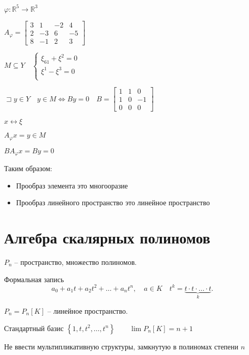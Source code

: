 \documentclass{book}
\newcommand\R{\ensuremath{\mathbb{R}}}
\theoremstyle{definition}
\begin{document}
\begin{problem}
    $\varphi:\R^5 \to \R^3$

    $A_{\varphi} = \begin{bmatrix} 3&1&-2&4\\2&-3&6&-5\\8&-1&2&3 \end{bmatrix} $ 

    $M\subseteq Y\quad \begin{cases}
        \xi_{61} + \xi^2 = 0\\
        \xi^1 - \xi^3 = 0\\
    \end{cases}$ 

    $\sqsupset y\in Y\quad y\in M \iff By = 0\quad B = \begin{bmatrix} 1&1&0\\1&0&-1\\0&0&0 \end{bmatrix} $

     $x\longleftrightarrow \xi$

     $A_{\varphi}x = y\in M$

     $BA_{\varphi}x = By = 0$

    Таким образом:
    \begin{itemize}
        \item Прообраз элемента это многооразие
        \item Прообраз линейного пространство это линейное пространство
    \end{itemize}
\end{problem}

\section{Алгебра скалярных полиномов}

$P_n$ -- пространство, множество полиномов. 

 \begin{definition}
     [Полином]
     Формальная запись \[
         a_0 + a_1t + a_2t^2 + \ldots + a_nt^n,\quad a\in K\quad t^k = \underbrace{t\cdot t\cdot \ldots\cdot t}_k
     .\] 
\end{definition}

$P_n = P_n[K]$ -- линейное пространство.

Стандартный базис  $\left\{ 1, t, t^2, \ldots, t^n \right\} \qquad \lim P_n[K] = n+1$

Не ввести мультипликативную структуры, замкнутую в полиномах степени $n$
\end{document}
